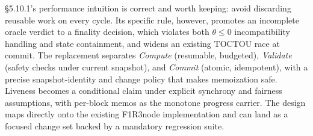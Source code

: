 \documentclass[11pt]{article}
\begin{document}
§5.10.1's performance intuition is correct and worth keeping: avoid
discarding reusable work on every cycle. Its specific rule, however,
promotes an incomplete oracle verdict to a finality decision, which
violates both $\theta \le 0$ incompatibility handling and state
containment, and widens an existing TOCTOU race at commit. The
replacement separates \emph{Compute} (resumable, budgeted),
\emph{Validate} (safety checks under current snapshot), and
\emph{Commit} (atomic, idempotent), with a precise snapshot-identity
and change policy that makes memoization safe. Liveness becomes a
conditional claim under explicit synchrony and fairness assumptions,
with per-block memos as the monotone progress carrier. The design maps
directly onto the existing F1R3node implementation and can land as a
focused change set backed by a mandatory regression suite.
\end{document}
